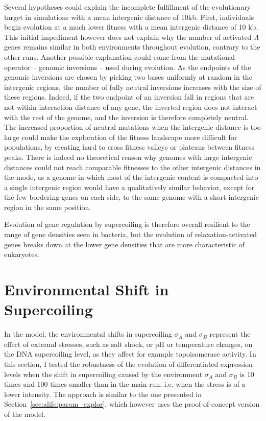 Several hypotheses could explain the incomplete fulfillment of the evolutionary target in simulations with a mean intergenic distance of 10kb.
First, individuals begin evolution at a much lower fitness with a mean intergenic distance of 10 kb.
This initial impediment however does not explain why the number of activated \emph{A} genes remains similar in both environments throughout evolution, contrary to the other runs.
Another possible explanation could come from the mutational operator -- genomic inversions -- used during evolution.
As the endpoints of the genomic inversions are chosen by picking two bases uniformly at random in the intergenic regions, the number of fully neutral inversions increases with the size of these regions.
Indeed, if the two endpoint of an inversion fall in regions that are not within interaction distance of any gene, the inverted region does not interact with the rest of the genome, and the inversion is therefore completely neutral.
The increased proportion of neutral mutations when the intergenic distance is too large could make the exploration of the fitness landscape more difficult for populations, by creating hard to cross fitness valleys or plateaus between fitness peaks.
There is indeed no theoretical reason why genomes with large intergenic distances could not reach comparable fitnesses to the other intergenic distances in the mode, as a genome in which most of the intergenic content is compacted into a single intergenic region would have a qualitatively similar behavior, except for the few bordering genes on each side, to the same genome with a short intergenic region in the same position.

Evolution of gene regulation by supercoiling is therefore overall resilient to the range of gene densities seen in bacteria, but the evolution of relaxation-activated genes breaks down at the lower gene densities that are more characteristic of eukaryotes.


\section{Environmental Shift in Supercoiling}
\label{sec:param:sigma-env}

In the model, the environmental shifts in supercoiling $\sigma_A$ and $\sigma_B$ represent the effect of external stresses, such as salt shock, or pH or temperature changes, on the DNA supercoiling level, as they affect for example topoisomerase activity.
In this section, I tested the robustness of the evolution of differentiated expression levels when the shift in supercoiling caused by the environment $\sigma_A$ and $\sigma_B$ is 10 times and 100 times smaller than in the main run, i.e. when the stress is of a lower intensity.
The approach is similar to the one presented in Section~\ref{sec:alife:param_explor}, which however uses the proof-of-concept version of the model.

